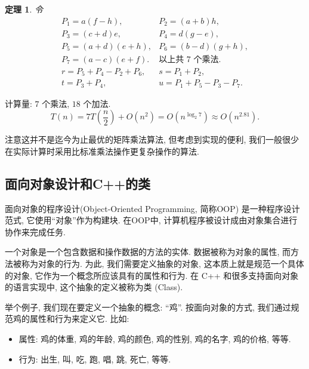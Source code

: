\documentclass[a4paper]{ctexart}
\newtheorem{theorem}{定理}
\theoremstyle{definition}
\theoremstyle{definition}
\begin{document}
\begin{theorem}
  令 
  \begin{equation}
    \begin{array}{ll}
      P_1 = a(f - h), & P_2 = (a + b) h, \\
      P_3 = (c + d) e, & P_4 = d(g - e), \\
      P_5 = (a + d)(e + h), & P_6 = (b - d)(g + h), \\
      P_7 = (a - c)(e + f). & \mbox{以上共 $7$ 个乘法}. \\
      r = P_5 + P_4 - P_2 + P_6, & s = P_1 + P_2, \\
      t = P_3 + P_4, & u = P_1 + P_5 - P_3 - P_7.
    \end{array}
  \end{equation}
\end{theorem}

计算量: $7$ 个乘法, $18$ 个加法. 
\begin{equation}
  T(n) = 7 T(\frac{n}{2}) + O(n^2) = O(n^{\log_2 7}) \approx O(n^{2.81}).
\end{equation}

注意这并不是迄今为止最优的矩阵乘法算法, 但考虑到实现的便利, 
我们一般很少在实际计算时采用比标准乘法操作更复杂操作的算法. 

\subsection{面向对象设计和C++的类}
面向对象的程序设计(Object-Oriented Programming, 简称OOP) 是一种程序设计范式, 它使用``对象''作为构建块. 在OOP中, 
计算机程序被设计成由对象集合进行协作来完成任务.

一个对象是一个包含数据和操作数据的方法的实体. 数据被称为对象的属性, 而方法被称为对象的行为. 为此, 我们需要定义抽象的对象, 
这本质上就是规范一个具体的对象, 它作为一个概念所应该具有的属性和行为. 在 C++ 和很多支持面向对象的语言实现中, 
这个抽象的定义被称为类 (Class).

举个例子, 我们现在要定义一个抽象的概念: ``鸡''. 按面向对象的方式, 我们通过规范鸡的属性和行为来定义它. 比如:
\begin{itemize}
  \item 属性: 鸡的体重, 鸡的年龄, 鸡的颜色, 鸡的性别, 鸡的名字, 鸡的价格, 等等.
  \item 行为: 出生, 叫, 吃, 跑, 唱, 跳, 死亡, 等等.
\end{itemize}  
\end{document}
